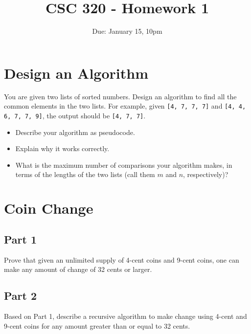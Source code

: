 \documentclass[12pt]{article}
\title{CSC 320 - Homework 1}
\author{}
\date{Due: January 15, 10pm}
\begin{document}
\tableofcontents

\section{Design an Algorithm}

You are given two lists of sorted numbers. Design an algorithm to find all the common elements in the two lists. For example, given \verb+[4, 7, 7, 7]+ and \verb+[4, 4, 6, 7, 7, 9]+, the output should be \verb+[4, 7, 7]+. 

\begin{itemize}
    \item Describe your algorithm as pseudocode.
    \item Explain why it works correctly.
    \item What is the maximum number of comparisons your algorithm makes, in terms of the lengths of the two lists (call them $m$ and $n$, respectively)?
\end{itemize}


\clearpage
\section{Coin Change}

\subsection*{Part 1}
Prove that given an unlimited supply of 4-cent coins and 9-cent coins, one can make any amount of change of 32 cents or larger.

\vspace{4in}

\subsection*{Part 2}
Based on Part 1, describe a recursive algorithm to make change using 4-cent and 9-cent coins for any amount greater than or equal to 32 cents.\\~

    \begin{algorithmic}

        \LComment{%
                  \vspace{1.3in}\\}

        \EndProcedure
    \end{algorithmic}
\end{document}
